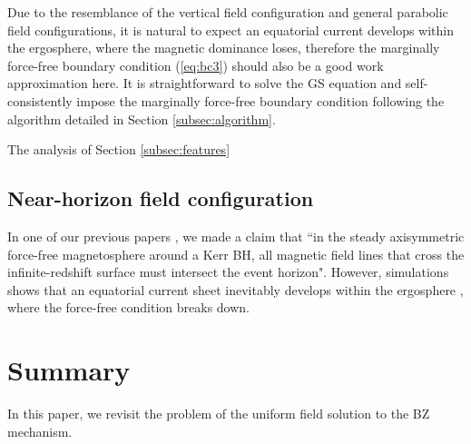 \documentclass[aps,prd,reprint,nofootinbib, superscriptaddress]{revtex4-1}
\begin{document}
Due to the resemblance of the vertical field configuration and general parabolic field configurations,
it is natural to expect an equatorial current develops within the ergosphere,
where the magnetic dominance loses, therefore the marginally force-free boundary
condition (\ref{eq:bc3}) should also be a good work approximation here.
It is straightforward to solve the GS equation and self-consistently
impose the marginally force-free boundary condition following the
algorithm detailed in Section \ref{subsec:algorithm}.

The analysis of Section \ref{subsec:features}



\subsection{Near-horizon field configuration}
In one of our previous papers \cite{Pan2016a}, we made a claim that ``in the steady axisymmetric force-free magnetosphere
around a Kerr BH, all magnetic field lines that cross the infinite-redshift surface must intersect the event horizon".
However, simulations shows that an equatorial current sheet inevitably develops within the ergosphere , where
the force-free condition breaks down.


\section{Summary}
\label{sec:summary}

In this paper, we revisit the problem of the uniform field solution to the BZ mechanism.


\end{document}

